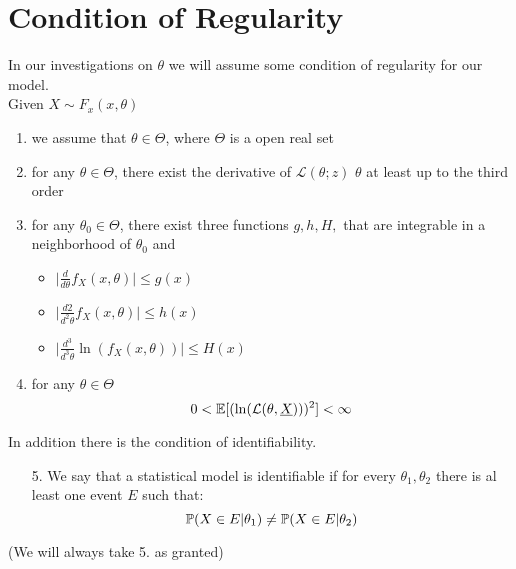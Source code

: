 \section{Condition of Regularity}
In our investigations on $\theta$ we will assume some condition of regularity for our model.\\
Given $X\sim F_x(x,\theta)$
\begin{enumerate}
	\item we assume that $\theta \in \Theta$, where $\Theta$  is a open real set
	\item for any $\theta \in \Theta$, there exist the  derivative of $\mathcal{L}(\theta;z)$ \wrt $\theta$ at least up to the third order
	\item for any $\theta_0 \in \Theta$, there exist three functions $g,h,H,$ that are integrable in a neighborhood of $\theta_0$  and 
	\begin{itemize}
		\item $\bigg| \frac{d}{d\theta} f_X(x,\theta) \bigg|\leq g(x)$
		\item $\bigg| \frac{d2}{d^2\theta} f_X(x,\theta) \bigg|\leq h(x)$
		\item $\bigg| \frac{d^3}{d^3\theta} \ln(f_X(x,\theta)) \bigg|\leq H(x)$
	\end{itemize}
	\item for any $\theta \in \Theta$
	$$0<\mathbb{E}[(\ln(\mathcal{L}(\theta, \underline X)))^2]<\infty$$
\end{enumerate}
In addition there is the condition of identifiability.
\begin{itemize}
	\item[5.] We say that a statistical model is identifiable if for every  $\theta_1,\theta_2$ there is al least one event $E$ such that:
	$$\mathbb{P}(X\in E | \theta_1)\not =\mathbb{P}(X\in E | \theta_2)$$
\end{itemize}
(We will always take 5. as granted)
